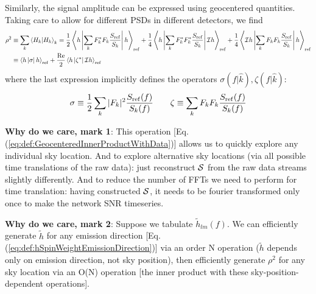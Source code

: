 \documentclass[twocolumn,prd,nofootinbib]{revtex4}
\newcommand\qmstateproduct[2]{\left\langle#1|#2\right\rangle}
\newcommand\qmoperatorelement[3]{\left\langle#1\left|#2\right|#3\right\rangle}
\begin{document}
\begin{widetext}
\begin{shaded}
Similarly, the signal amplitude can be expressed using geocentered quantities.  Taking care to allow for different PSDs
in different detectors, we find
\begin{align}
\label{eq:CalculateRhoFromGeocenterStrain}
\rho^2& \equiv \sum_k \qmstateproduct{H_k}{H_k}_k 
 =  \frac{1}{2}\qmoperatorelement{h}{\sum_k F_k^* F_k\frac{S_{\rm ref}}{S_k}}{h}_{\rm ref} 
 + \frac{1}{4}\qmoperatorelement{h}{\sum_k F_k^* F_k^* \frac{S_{\rm ref}}{S_k}}{{\cal I} h}_{\rm ref}  
 + \frac{1}{4}\qmoperatorelement{{\cal     I}h}{\sum_k F_k F_k \frac{S_{\rm ref}}{S_k}}{h}_{\rm ref}  \\
&\equiv  \qmoperatorelement{h}{\sigma}{h}_{\rm ref}  + \frac{\text{Re}}{2} \qmoperatorelement{h}{\zeta^*}{{\cal I}
   h}_{\rm ref}
\end{align}
where the last expression implicitly defines the operators $\sigma(f|\hat{k}), \zeta(f|\hat{k})$:
\begin{eqnarray}
\sigma \equiv \frac{1}{2} \sum_k |F_k|^2 \frac{S_{\rm ref}(f)}{S_k(f)} 
\qquad 
\zeta \equiv \sum_k F_k F_k \frac{S_{\rm ref}(f)}{S_k(f)} 
\end{eqnarray}

\noindent \textbf{Why do we care, mark 1}: This operation [Eq. (\ref{eq:def:GeocenteredInnerProductWithData})] allows us to quickly explore any individual sky location.  And to
explore alternative sky locations (via all possible time translations of the raw data): just reconstruct ${\cal S}$ from
the raw data streams slightly differently.   And to reduce the number of FFTs we need to perform for time translation:
having constructed ${\cal S}$, it needs to be fourier transformed only once to make the network SNR timeseries.

\noindent \textbf{Why do we care, mark 2}: Suppose we tabulate $\tilde{h}_{lm}(f)$. We can efficiently generate
$\tilde{h}$ for any emission direction [Eq. (\ref{eq:def:hSpinWeightEmissionDirection})] via an order N operation
($\tilde{h}$ depends only on emission direction, not sky position),
then efficiently generate $\rho^2$ for any sky location via an O(N) operation [the inner product with these
  sky-position-dependent operations].  


\end{shaded}
\end{widetext}
\end{document}
